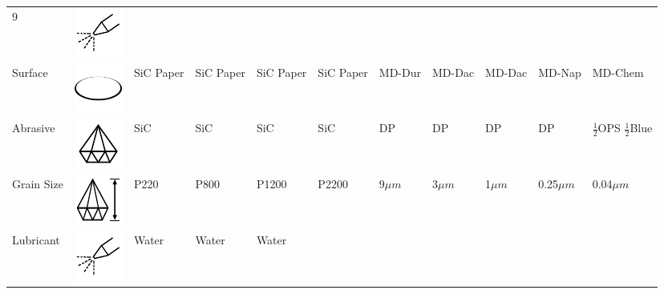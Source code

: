 \documentclass{article}
\begin{document}
\begin{table}
\begin{tabular}{|lr|lr|lr|lr|lr|lr|lr|lr|lr|lr|}
9 & \includegraphics[valign=m]{Symbols_SVG/Lubricant_symbol}
\\ \cline{1-20} %
Surface & \includegraphics[valign=m]{Symbols_SVG/Surface_plain} & 
\multicolumn{2}{l|}{SiC Paper} & \multicolumn{2}{l|}{SiC Paper} & \multicolumn{2}{l|}{SiC Paper} &
\multicolumn{2}{l|}{SiC Paper} & \multicolumn{2}{l|}{MD-Dur} & \multicolumn{2}{l|}{MD-Dac} &
\multicolumn{2}{l|}{MD-Dac} & \multicolumn{2}{l|}{MD-Nap} & \multicolumn{2}{l|}{MD-Chem} 
\\ \cline{1-20} %
Abrasive & \includegraphics[valign=m]{Symbols_SVG/Diamond} & 
\multicolumn{2}{l|}{SiC} & \multicolumn{2}{l|}{SiC} & \multicolumn{2}{l|}{SiC} &
\multicolumn{2}{l|}{SiC} & \multicolumn{2}{l|}{DP} & \multicolumn{2}{l|}{DP} &
\multicolumn{2}{l|}{DP} & \multicolumn{2}{l|}{DP} & \multicolumn{2}{l|}{$\frac{1}{2}$OPS $\frac{1}{2}$Blue} 
\\ \cline{1-20} %
Grain Size & \includegraphics[valign=m]{Symbols_SVG/Diamond_Length_symbol} & 
\multicolumn{2}{l|}{P220} & \multicolumn{2}{l|}{P800} & \multicolumn{2}{l|}{P1200} &
\multicolumn{2}{l|}{P2200} & \multicolumn{2}{l|}{9$\mu m$} & \multicolumn{2}{l|}{3$\mu m$} &
\multicolumn{2}{l|}{1$\mu m$} & \multicolumn{2}{l|}{0.25$\mu m$} & \multicolumn{2}{l|}{0.04$\mu m$} 
\\ \cline{1-20} %
Lubricant & \includegraphics[valign=m]{Symbols_SVG/Lubricant_symbol} & 
\multicolumn{2}{l|}{Water} & \multicolumn{2}{l|}{Water} & \multicolumn{2}{l|}{Water} &

\end{tabular}
\end{table}
\end{document}
